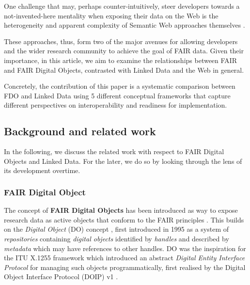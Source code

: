 One challenge that may, perhaps counter-intuitively, steer developers towards a not-invented-here mentality \cite{stefiDevelopersMakeUnbiased2015,stefiDevelopReuseTwo2015a} when exposing their data on the Web is the heterogeneity and apparent complexity of Semantic Web approaches themselves \cite{merono-penuelaWebDataApis2021b}.

These approaches, thus, form two of the major avenues for allowing developers and the wider research community to achieve the goal of FAIR data. Given their importance, in this article, we aim to examine the relationships between FAIR and FAIR Digital Objects, contrasted with Linked Data and the Web in general.

Concretely, the contribution of this paper is a systematic comparison between FDO and Linked Data using 5 different conceptual frameworks that capture different perspectives on interoperability and readiness for implementation.

\hypertarget{ch3:background}{%
\subsection{Background and related work}\label{ch3:background}}

In the following, we discuss the related work with respect to FAIR Digital Objects and Linked Data. For the later, we do so by looking through the lens of its development overtime.

\hypertarget{ch3:fdo}{%
\subsubsection{FAIR Digital Object}\label{ch3:fdo}}

The concept of \textbf{FAIR Digital Objects} \cite{schultesFAIRPrinciplesDigital2019a} has been introduced as way to expose research data as active objects that conform to the FAIR principles \cite{wilkinsonFAIRGuidingPrinciples2016e}. This builds on the \emph{Digital Object} (DO) concept \cite{kahnFrameworkDistributedDigital2006b}, first introduced in 1995 \cite{kahnFrameworkDistributedDigital1995a} as a system of \emph{repositories} containing \emph{digital objects} identified by \emph{handles} and described by \emph{metadata} which may have references to other handles. DO was the inspiration for the ITU X.1255 framework \cite{x1255FrameworkDiscovery} which introduced an abstract \emph{Digital Entity Interface Protocol} for managing such objects programmatically, first realised by the Digital Object Interface Protocol (DOIP) v1 \cite{DigitalObjectInterface}.


